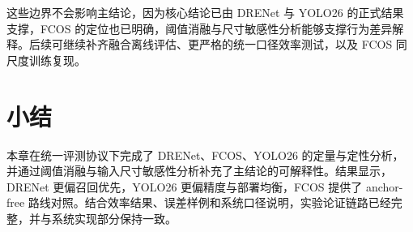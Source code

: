 这些边界不会影响主结论，因为核心结论已由 DRENet 与 YOLO26 的正式结果支撑，FCOS 的定位也已明确，阈值消融与尺寸敏感性分析能够支撑行为差异解释。后续可继续补齐融合离线评估、更严格的统一口径效率测试，以及 FCOS 同尺度训练复现。

\section{小结}

本章在统一评测协议下完成了 DRENet、FCOS、YOLO26 的定量与定性分析，并通过阈值消融与输入尺寸敏感性分析补充了主结论的可解释性。结果显示，DRENet 更偏召回优先，YOLO26 更偏精度与部署均衡，FCOS 提供了 anchor-free 路线对照。结合效率结果、误差样例和系统口径说明，实验论证链路已经完整，并与系统实现部分保持一致。
